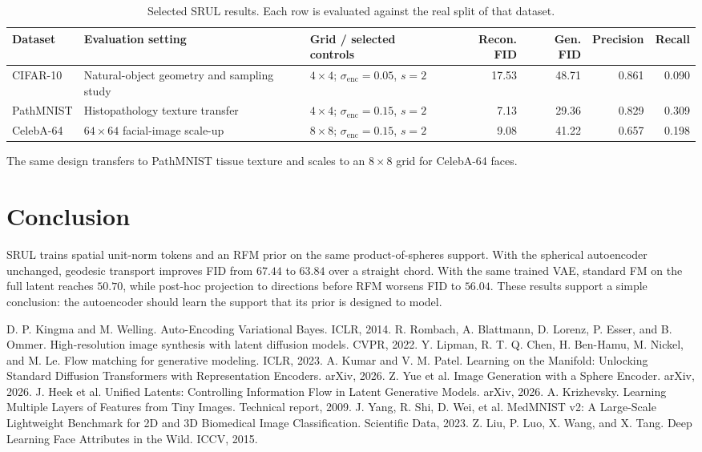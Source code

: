 \documentclass{article}
\begin{document}
\begin{table}[H]
\centering
\scriptsize
\caption{Selected SRUL results. Each row is evaluated against the real split of that dataset.}
\label{tab:domains}
\setlength{\tabcolsep}{2.8pt}
\renewcommand{\arraystretch}{1.08}
\begin{tabular}{p{1.25cm}p{3.0cm}p{2.2cm}rrrr}
\toprule
Dataset & Evaluation setting & Grid / selected controls & Recon. FID & Gen. FID & Precision & Recall \\
\midrule
CIFAR-10 & Natural-object geometry and sampling study & $4\times4$; $\sigma_{\mathrm{enc}}=0.05$, $s=2$ & 17.53 & 48.71 & 0.861 & 0.090 \\
PathMNIST & Histopathology texture transfer & $4\times4$; $\sigma_{\mathrm{enc}}=0.15$, $s=2$ & 7.13 & 29.36 & 0.829 & 0.309 \\
CelebA-64 & $64\times64$ facial-image scale-up & $8\times8$; $\sigma_{\mathrm{enc}}=0.15$, $s=2$ & 9.08 & 41.22 & 0.657 & 0.198 \\
\bottomrule
\end{tabular}
\end{table}
The same design transfers to PathMNIST tissue texture and scales to an $8\times8$ grid for CelebA-64 faces.

\section{Conclusion}
SRUL trains spatial unit-norm tokens and an RFM prior on the same product-of-spheres support. With the spherical autoencoder unchanged, geodesic transport improves FID from $67.44$ to $63.84$ over a straight chord. With the same trained VAE, standard FM on the full latent reaches $50.70$, while post-hoc projection to directions before RFM worsens FID to $56.04$. These results support a simple conclusion: the autoencoder should learn the support that its prior is designed to model.

\clearpage
{\small
\begin{thebibliography}{10}
 D. P. Kingma and M. Welling. Auto-Encoding Variational Bayes. ICLR, 2014.
 R. Rombach, A. Blattmann, D. Lorenz, P. Esser, and B. Ommer. High-resolution image synthesis with latent diffusion models. CVPR, 2022.
 Y. Lipman, R. T. Q. Chen, H. Ben-Hamu, M. Nickel, and M. Le. Flow matching for generative modeling. ICLR, 2023.
 A. Kumar and V. M. Patel. Learning on the Manifold: Unlocking Standard Diffusion Transformers with Representation Encoders. arXiv, 2026.
 Z. Yue et al. Image Generation with a Sphere Encoder. arXiv, 2026.
 J. Heek et al. Unified Latents: Controlling Information Flow in Latent Generative Models. arXiv, 2026.
 A. Krizhevsky. Learning Multiple Layers of Features from Tiny Images. Technical report, 2009.
 J. Yang, R. Shi, D. Wei, et al. MedMNIST v2: A Large-Scale Lightweight Benchmark for 2D and 3D Biomedical Image Classification. Scientific Data, 2023.
 Z. Liu, P. Luo, X. Wang, and X. Tang. Deep Learning Face Attributes in the Wild. ICCV, 2015.
\end{thebibliography}}
\end{document}
